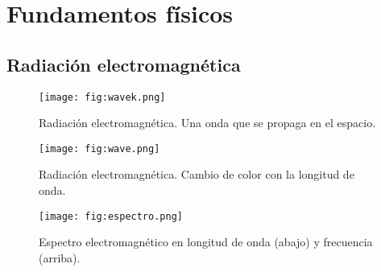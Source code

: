 \section{Fundamentos físicos}


\subsection{Radiación electromagnética}
\begin{frame}{}
  \begin{figure}
    \centering
    \texttt{[image: fig:wavek.png]}
    \caption{Radiación electromagnética. Una onda que se propaga en el espacio.}
    \label{}
  \end{figure}
\end{frame}

\begin{frame}{}
  \begin{figure}
    \centering
    \texttt{[image: fig:wave.png]}
    \caption{Radiación electromagnética. Cambio de color con la longitud de onda.}
    \label{}
  \end{figure}
\end{frame}

\begin{frame}{}
  \begin{figure}
    \centering
    \texttt{[image: fig:espectro.png]}
    \caption{Espectro electromagnético en longitud de onda (abajo) y frecuencia (arriba).}
    \label{}
  \end{figure}
\end{frame}


